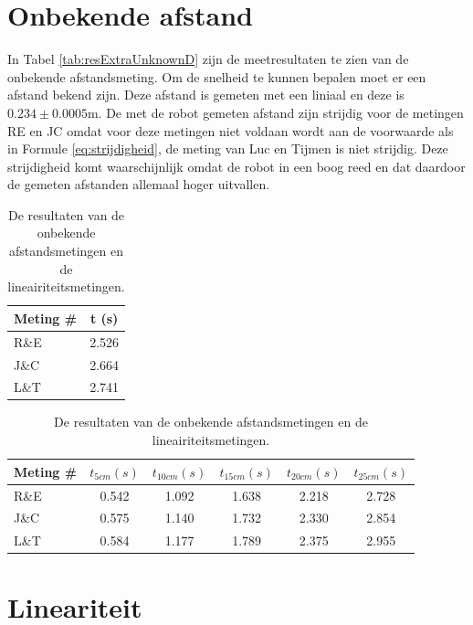 \documentclass{report}
\begin{document}
\section{Onbekende afstand}

In Tabel \ref{tab:resExtraUnknownD} zijn de meetresultaten te zien van de onbekende afstandsmeting. Om de snelheid te kunnen bepalen moet er een afstand bekend zijn. Deze afstand is gemeten met een liniaal en deze is $0.234 \pm 0.0005\mathrm{m}$. De met de robot gemeten afstand zijn strijdig voor de metingen RE en JC omdat voor deze metingen niet voldaan wordt aan de voorwaarde als in Formule \ref{eq:strijdigheid}, de meting van Luc en Tijmen is niet strijdig. Deze strijdigheid komt waarschijnlijk omdat de robot in een boog reed en dat daardoor de gemeten afstanden allemaal hoger uitvallen.


\begin{table}
	\centering
	\caption{De resultaten van de onbekende afstandsmetingen en de lineairiteitsmetingen.}

	\begin{subtable}[b]{0.33\linewidth}
		\centering
		\label{tab:resExtraUnknownD}
		\begin{tabular}{| l| c|}
		\hline
		  Meting \#  & t (s)\\
		\hline
		  R\&E & 2.526 \\
		\hline
		J\&C & 2.664 \\
		\hline
		L\&T & 2.741 \\
		\hline
		 \end{tabular}
	\end{subtable}
	\begin{subtable}[b]{0.66\linewidth}
		\centering
		\label{tab:resExtraLin}
		\begin{tabular}{| l| c| c| c| c| c|}
		\hline
		  Meting \# & $t_{5cm} (s)$ & $t_{10cm} (s)$ & $t_{15cm} (s)$ & $t_{20cm} (s)$ & $t_{25cm} (s)$\\
		\hline
		  R\&E & 0.542 & 1.092 & 1.638 & 2.218 & 2.728 \\
		\hline
		J\&C & 0.575 & 1.140 & 1.732 & 2.330 & 2.854 \\
		\hline
		L\&T & 0.584 & 1.177 & 1.789 & 2.375 & 2.955 \\
		\hline
		 \end{tabular}
	\end{subtable}
\end{table}

\section{Lineariteit}
\end{document}
